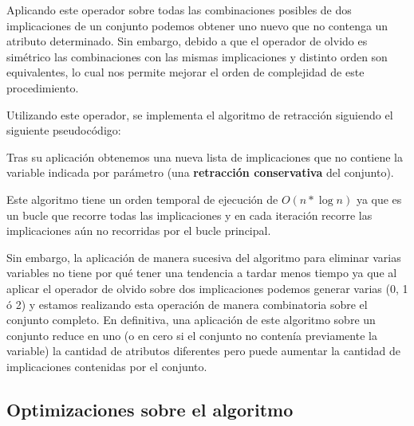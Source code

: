 	Aplicando este operador sobre todas las combinaciones posibles de dos implicaciones de un conjunto podemos obtener uno nuevo que no contenga un atributo determinado. Sin embargo, debido a que el operador de olvido es simétrico las combinaciones con las mismas implicaciones y distinto orden son equivalentes, lo cual nos permite mejorar el orden de complejidad de este procedimiento.
	
	Utilizando este operador, se implementa el algoritmo de retracción siguiendo el siguiente pseudocódigo: 
	
	{
		\centering
		\noindent{}	

	}

	
	Tras su aplicación obtenemos una nueva lista de implicaciones que no contiene la variable indicada por parámetro (una \textbf{retracción conservativa} del conjunto).
	
	Este algoritmo tiene un orden temporal de ejecución de $O(n*\log{n})$ ya que es un bucle que recorre todas las implicaciones y en cada iteración recorre las implicaciones aún no recorridas por el bucle principal. 
	
	Sin embargo, la aplicación de manera sucesiva del algoritmo para eliminar varias variables no tiene por qué tener una tendencia a tardar menos tiempo ya que al aplicar el operador de olvido sobre dos implicaciones podemos generar varias (0, 1 ó 2) y estamos realizando esta operación de manera combinatoria sobre el conjunto completo. En definitiva, una aplicación de este algoritmo sobre un conjunto reduce en uno (o en cero si el conjunto no contenía previamente la variable) la cantidad de atributos diferentes pero puede aumentar la cantidad de implicaciones contenidas por el conjunto. 
	


\subsection*{Optimizaciones sobre el algoritmo}
	
